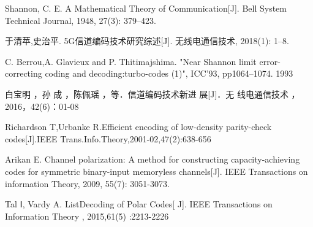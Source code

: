 \documentclass{article}
\begin{document}
\begin{thebibliography}{9}

Shannon, C. E. A Mathematical Theory of Communication[J]. Bell System Technical Journal, 1948, 27(3): 379--423.

于清苹,史治平. 5G信道编码技术研究综述[J]. 无线电通信技术, 2018(1): 1--8.

C. Berrou,A. Glavieux and P. Thitimajshima. "Near Shannon limit error-correcting coding and decoding:turbo-codes (1)", ICC'93, pp1064--1074. 1993

白宝明 ，孙 成 ，陈佩瑶 ，等．信道编码技术新进 展[J]．无 线电通信技术 ，2016，42(6)：01-08


Richardson T,Urbanke R.Efficient encoding of low-density parity-check codes[J].IEEE Trans.Info.Theory,2001-02,47(2):638-656


Arikan E. Channel polarization: A method for constructing capacity-achieving codes for symmetric binary-input memoryless channels[J]. IEEE Transactions on information Theory, 2009, 55(7): 3051-3073.

Tal Ⅰ, Vardy A. ListDecoding of Polar Codes[ J]. IEEE Transactions on Information Theory , 2015,61(5) :2213-2226

\end{thebibliography}
\end{document}
